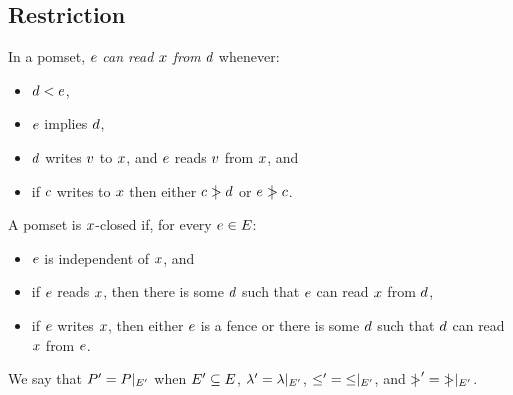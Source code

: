 \subsection{Restriction}
\label{sec:restriction}


\begin{definition}\label{def:rf}
  In a pomset, $e$ \emph{can read $x$ from} $d$ whenever: 
  \begin{itemize}
  \item $d < e$,  
  \item $e$ implies $d$,
  \item $d$ writes $v$ to $x$,
    and $e$ reads $v$ from $x$, and
  \item if $c$ writes to $x$
    then either $c \mathrel{\mkern4mu\mid\!\!\!>} d$ or $e \mathrel{\mkern4mu\mid\!\!\!>} c$.
  \end{itemize}
\end{definition}


\begin{definition}
\label{def:x-closed}
A pomset is $x$-closed if, for every $e\in E$:
  \begin{itemize}
  \item $e$ is independent of $x$, and
  \item if $e$ reads $x$, then there is some $d$ such that $e$
    can read $x$ from $d$,
  \item if $e$ writes $x$, then either $e$ is a fence or there is
    some $d$ such that $d$ can read $x$ from $e$.
  \end{itemize}
\end{definition}


We say that $P' = P\mathbin{|}_{E'}$ when 
 $E' \subseteq E$,
 ${\lambda'} = {\lambda}\mathbin{|}_{E'}$, 
 ${\le'} = {\le}\mathbin{|}_{E'}$, and
 ${\mathrel{\mkern4mu\mid\!\!\!>}'} = {\mathrel{\mkern4mu\mid\!\!\!>}}\mathbin{|}_{E'}$.

